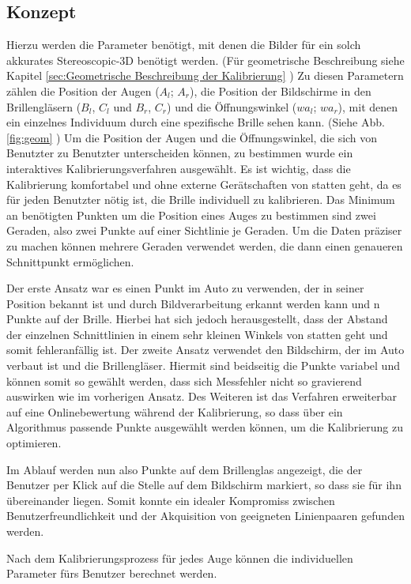 \subsection{Konzept}
Hierzu werden die Parameter benötigt, mit denen die Bilder für ein solch akkurates Stereoscopic-3D benötigt werden.
(Für geometrische Beschreibung siehe Kapitel \ref{sec:Geometrische Beschreibung der Kalibrierung} )
Zu diesen Parametern zählen die Position der Augen ($A_{l}$; $A_{r}$), die Position der Bildschirme in den Brillengläsern ($B_{l}$, $C_{l}$ und $B_{r}$, $C_{r}$) und die Öffnungswinkel ($wa_{l}$; $wa_{r}$), mit denen ein einzelnes Individuum durch eine spezifische Brille sehen kann. (Siehe Abb. \ref{fig:geom} )
Um die Position der Augen und die Öffnungswinkel, die sich von Benutzter zu Benutzter unterscheiden können, zu bestimmen wurde ein interaktives Kalibrierungsverfahren ausgewählt. Es ist wichtig, dass die Kalibrierung komfortabel und ohne externe Gerätschaften von statten geht, da es für jeden Benutzter nötig ist, die Brille individuell zu kalibrieren. Das Minimum an benötigten Punkten um die Position eines Auges zu bestimmen sind zwei Geraden, also zwei Punkte auf einer Sichtlinie je Geraden. Um die Daten präziser zu machen können mehrere Geraden verwendet werden, die dann einen genaueren Schnittpunkt ermöglichen. 

Der erste Ansatz war es einen Punkt im Auto zu verwenden, der in seiner Position bekannt ist und durch Bildverarbeitung erkannt werden kann und n Punkte auf der Brille. Hierbei hat sich jedoch herausgestellt, dass der Abstand der einzelnen Schnittlinien in einem sehr kleinen Winkels von statten geht und somit fehleranfällig ist. Der zweite Ansatz verwendet den Bildschirm, der im Auto verbaut ist und die Brillengläser. Hiermit sind beidseitig die Punkte variabel und können somit so gewählt werden, dass sich Messfehler nicht so gravierend auswirken wie im vorherigen Ansatz. Des Weiteren ist das Verfahren erweiterbar auf eine Onlinebewertung während der Kalibrierung, so dass über ein Algorithmus passende Punkte ausgewählt werden können, um die Kalibrierung zu optimieren.

Im Ablauf werden nun also Punkte auf dem Brillenglas angezeigt, die der Benutzer per Klick auf die Stelle auf dem Bildschirm markiert, so dass sie für ihn übereinander liegen. Somit konnte ein idealer Kompromiss zwischen Benutzerfreundlichkeit und der Akquisition von geeigneten Linienpaaren gefunden werden.

Nach dem Kalibrierungsprozess für jedes Auge können die individuellen Parameter fürs Benutzer berechnet werden.

